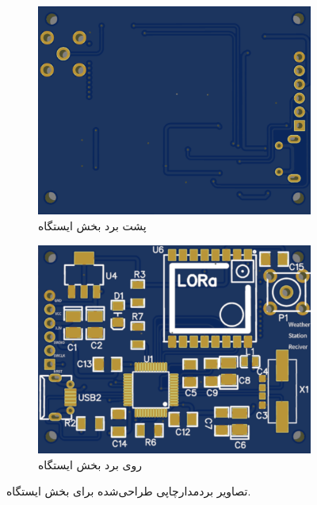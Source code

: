 \begin{figure}[H]
	\begin{subfigure}[b]{0.5\textwidth}
		\includegraphics[width=\linewidth]{Assets/receiverBack.png}
		\caption{پشت برد بخش ایستگاه}
		\label{fig:receiverBack}
	\end{subfigure}
	\begin{subfigure}[b]{0.5\textwidth}
		\includegraphics[width=\linewidth]{Assets/receiverFront.png}
		\caption{روی برد بخش ایستگاه}
		\label{fig:receiverFront}
	\end{subfigure}
	\caption{تصاویر بردمدارچاپی طراحی‌شده برای بخش ایستگاه.}
	\label{fig:PCB3dviewreceiver}
\end{figure}